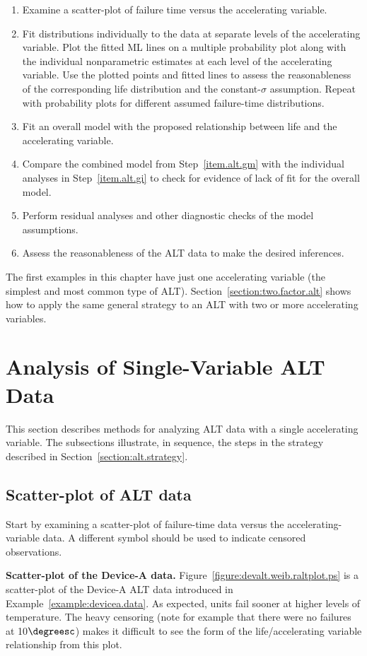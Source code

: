 \begin{enumerate}
\item
Examine a scatter-plot of failure time versus the accelerating variable.
\item
\label{item.alt.gi}
Fit distributions individually to the data at separate levels of the
accelerating variable.  Plot the fitted ML lines on a multiple
probability plot along with the individual nonparametric estimates
at each level of the accelerating variable. Use the plotted points
and fitted lines to assess the reasonableness of the corresponding
life distribution and the constant-$\sigma$ assumption. Repeat with
probability plots for different assumed failure-time distributions.
\item
\label{item.alt.gm}
Fit an overall model with the proposed relationship between life and
the accelerating variable.
\item
Compare the combined model from Step~\ref{item.alt.gm} with the individual
analyses in  Step~\ref{item.alt.gi} to
check for evidence of lack of fit for the overall model.
\item
Perform residual analyses and other diagnostic checks of the model
assumptions.
\item
Assess the reasonableness of the ALT data to make the
desired inferences.
\end{enumerate}
The first examples in this chapter have just one accelerating
variable (the simplest and most common type of ALT).
Section~\ref{section:two.factor.alt} shows how to apply
the same general strategy to an ALT with two or more accelerating variables.
\section{Analysis of Single-Variable ALT Data}
\label{section:single.factor.alt}
This section describes methods for analyzing ALT data with a single
accelerating variable.  The subsections illustrate, in sequence, the
steps in the strategy described in Section~\ref{section:alt.strategy}.

\subsection{Scatter-plot of ALT data}
Start by examining a scatter-plot of failure-time data versus the
accelerating-variable data. A different symbol should be used
to indicate censored observations.
\begin{example}{\bf Scatter-plot of the Device-A data.}
Figure~\ref{figure:devalt.weib.raltplot.ps} is a scatter-plot of the
Device-A ALT data introduced in Example~\ref{example:devicea.data}. As
expected, units fail sooner at higher levels of temperature.  The
heavy censoring (note for example that there were no failures at
10$\degreesc$) makes it difficult to see the form of the
life/accelerating variable relationship from this plot.
\end{example}

